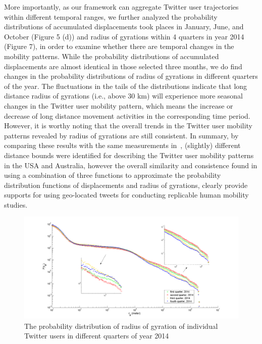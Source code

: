 \documentclass[a4paper, 11pt]{article}
\begin{document}
More importantly, as our framework can aggregate Twitter user trajectories within different temporal ranges, we further analyzed the probability distributions of accumulated displacements took places in January, June, and October (Figure 5 (d)) and radius of gyrations within 4 quarters in year 2014 (Figure 7), in order to examine whether there are temporal changes in the mobility patterns. While the probability distributions of accumulated displacements are almost identical in those selected three months,  we do find changes in the probability distributions of radius of gyrations in different quarters of the year. 
The fluctuations in the tails of the distributions indicate that long distance radius of gyrations (i.e., above 30 km) will experience more seasonal changes in the Twitter user mobility pattern, which means the increase or decrease of long distance movement activities in the corresponding time period. 
However, it is worthy noting that the overall trends in the Twitter user mobility patterns revealed by radius of gyrations are still consistent.  In summary, by comparing these results with the same measurements in~\citep{Jurdak2015}, (slightly) different distance bounds were identified for describing the Twitter user mobility patterns in the USA and Australia, however the overall similarity and consistence found in using a combination of three functions to approximate the probability distribution functions of displacements and radius of gyrations, clearly provide supports for using geo-located tweets for conducting replicable human mobility studies.       
 
\begin{figure}[h]
\centering
\includegraphics[width=1.0\linewidth]{./figures/gyration_season}
\caption{The probability distribution of radius of gyration of individual Twitter users in different quarters of year 2014}
\label{fig:Arch}
\end{figure}
\FloatBarrier
\end{document}
